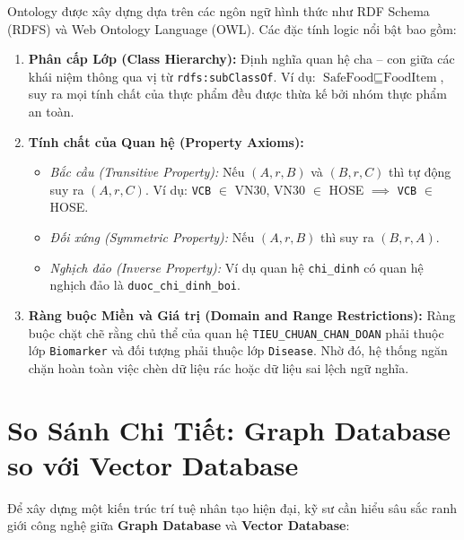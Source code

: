 \documentclass[12pt,a4paper]{report}
\begin{document}
Ontology được xây dựng dựa trên các ngôn ngữ hình thức như RDF Schema (RDFS) và Web Ontology Language (OWL). Các đặc tính logic nổi bật bao gồm:
\begin{enumerate}[itemsep=2pt, parsep=0pt, topsep=3pt]
    \item \textbf{Phân cấp Lớp (Class Hierarchy):} Định nghĩa quan hệ cha -- con giữa các khái niệm thông qua vị từ \texttt{rdfs:subClassOf}. Ví dụ: $\text{SafeFood} \sqsubseteq \text{FoodItem}$, suy ra mọi tính chất của thực phẩm đều được thừa kế bởi nhóm thực phẩm an toàn.
    \item \textbf{Tính chất của Quan hệ (Property Axioms):}
    \begin{itemize}[itemsep=1pt, parsep=0pt, topsep=2pt]
        \item \textit{Bắc cầu (Transitive Property):} Nếu $(A, r, B)$ và $(B, r, C)$ thì tự động suy ra $(A, r, C)$. Ví dụ: \texttt{VCB} $\in$ VN30, VN30 $\in$ HOSE $\implies$ \texttt{VCB} $\in$ HOSE.
        \item \textit{Đối xứng (Symmetric Property):} Nếu $(A, r, B)$ thì suy ra $(B, r, A)$.
        \item \textit{Nghịch đảo (Inverse Property):} Ví dụ quan hệ \texttt{chi\_dinh} có quan hệ nghịch đảo là \texttt{duoc\_chi\_dinh\_boi}.
    \end{itemize}
    \item \textbf{Ràng buộc Miền và Giá trị (Domain and Range Restrictions):} Ràng buộc chặt chẽ rằng chủ thể của quan hệ \texttt{TIEU\_CHUAN\_CHAN\_DOAN} phải thuộc lớp \texttt{Biomarker} và đối tượng phải thuộc lớp \texttt{Disease}. Nhờ đó, hệ thống ngăn chặn hoàn toàn việc chèn dữ liệu rác hoặc dữ liệu sai lệch ngữ nghĩa.
\end{enumerate}

\section{So Sánh Chi Tiết: Graph Database so với Vector Database}

Để xây dựng một kiến trúc trí tuệ nhân tạo hiện đại, kỹ sư cần hiểu sâu sắc ranh giới công nghệ giữa \textbf{Graph Database} và \textbf{Vector Database}:
\end{document}
